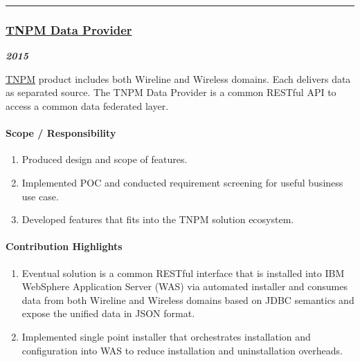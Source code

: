 \documentclass[
]{article}
\providecommand{\tightlist}{%
  \setlength{\itemsep}{0pt}\setlength{\parskip}{0pt}}
\begin{document}
\begin{center}\rule{0.5\linewidth}{0.5pt}\end{center}

\hypertarget{tnpm-data-provider}{%
\subsubsection{\texorpdfstring{\href{https://www-304.ibm.com/software/brandcatalog/ismlibrary/details?catalog.label=1TW10NP6I}{TNPM
Data Provider}}{TNPM Data Provider}}\label{tnpm-data-provider}}

\textbf{\emph{2015}}

\href{https://www.ibm.com/support/knowledgecenter/SSBNJ7_1.4.0/com.ibm.tnpm_1.4_kc.doc/quick_start/tnpm_1.4_quick_start_guide.html}{TNPM}
product includes both Wireline and Wireless domains. Each delivers data
as separated source. The TNPM Data Provider is a common RESTful API to
access a common data federated layer.

\hypertarget{scope-responsibility-9}{%
\paragraph{Scope / Responsibility}\label{scope-responsibility-9}}

\begin{enumerate}
\def\labelenumi{\arabic{enumi}.}
\tightlist
\item
  Produced design and scope of features.
\item
  Implemented POC and conducted requirement screening for useful
  business use case.
\item
  Developed features that fits into the TNPM solution ecosystem.
\end{enumerate}

\hypertarget{contribution-highlights-8}{%
\paragraph{Contribution Highlights}\label{contribution-highlights-8}}

\begin{enumerate}
\def\labelenumi{\arabic{enumi}.}
\tightlist
\item
  Eventual solution is a common RESTful interface that is installed into
  IBM WebSphere Application Server (WAS) via automated installer and
  consumes data from both Wireline and Wireless domains based on JDBC
  semantics and expose the unified data in JSON format.
\item
  Implemented single point installer that orchestrates installation and
  configuration into WAS to reduce installation and uninstallation
  overheads.
\end{enumerate}
\end{document}
